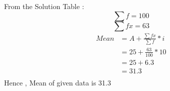 \documentclass[12pt, a4paper, twocolumn]{article}
\begin{document}
From the Solution Table :\\
\begin{equation*}
\sum f = 100
\end{equation*}
\begin{equation*}
\sum fx = 63
\end{equation*}
\begin{align*}
Mean & = A + \frac{ \sum fx }{\sum f} * i\\
     & = 25 + \frac{63}{100} * 10\\
     & = 25 + 6.3\\
     & = 31.3\\
\end{align*}
Hence , Mean of given data is 31.3\\
\end{document}
